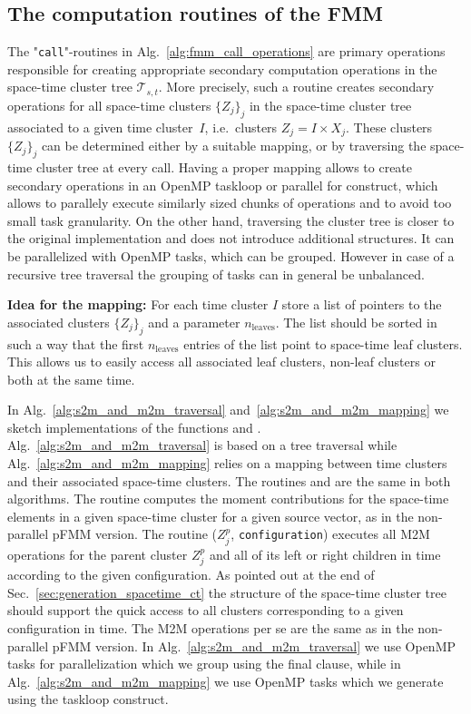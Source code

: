 \documentclass[a4paper,11pt]{article}
\theoremstyle{plain}
\theoremstyle{definition}
\theoremstyle{remark}
\begin{document}
\subsection{The computation routines of the FMM} \label{sec:primary_operations}
The "\texttt{call}"-routines in Alg.~\ref{alg:fmm_call_operations} are primary operations responsible for creating appropriate secondary computation operations in the space-time cluster tree $\mathcal{T}_{s,t}$. More precisely, such a routine creates  secondary operations for all space-time clusters $\{Z_j\}_j$ in the space-time cluster tree associated to a given time cluster~$I$, i.e.~clusters $Z_j = I \times X_j$. These clusters $\{Z_j\}_j$ can be determined either by a suitable mapping, or by traversing the space-time cluster tree at every call. Having a proper mapping allows to create secondary operations in an OpenMP taskloop or parallel for construct, which allows to parallely execute similarly sized chunks of operations and to avoid too small task granularity. On the other hand, traversing the cluster tree is closer to the original implementation and does not introduce additional structures. It can be parallelized with OpenMP tasks, which can be grouped. However in case of a recursive tree traversal the grouping of tasks can in general be unbalanced.

\textbf{Idea for the mapping:} For each time cluster $I$ store a list of pointers to the associated clusters $\{Z_j\}_j$ and a parameter $n_{\text{leaves}}$. The list should be sorted in such a way that the first $n_{\text{leaves}}$ entries of the list point to space-time leaf clusters. This allows us to easily access all associated leaf clusters, non-leaf clusters or both at the same time. 

In Alg.~\ref{alg:s2m_and_m2m_traversal} and~\ref{alg:s2m_and_m2m_mapping} we sketch implementations of the functions  and . Alg.~\ref{alg:s2m_and_m2m_traversal} is based on a tree traversal while Alg.~\ref{alg:s2m_and_m2m_mapping} relies on a mapping between time clusters and their associated space-time clusters. The routines  and  are the same in both algorithms. The routine  computes the moment contributions for the space-time elements in a given space-time cluster for a given source vector, as in the non-parallel pFMM version. The routine ($Z_j^p$, \texttt{configuration}) executes all M2M operations for the parent cluster $Z_j^p$ and all of its left or right children in time according to the given configuration. As pointed out at the end of Sec.~\ref{sec:generation_spacetime_ct} the structure of the space-time cluster tree should support the quick access to all clusters corresponding to a given configuration in time. The M2M operations per se are the same as in the non-parallel pFMM version. In Alg.~\ref{alg:s2m_and_m2m_traversal} we use OpenMP tasks for parallelization which we group using the final clause, while in Alg.~\ref{alg:s2m_and_m2m_mapping} we use OpenMP tasks which we generate using the taskloop construct.
\end{document}
